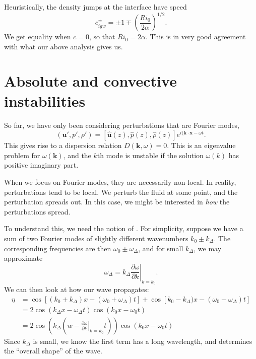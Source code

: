 \documentclass[a4paper]{article}
\begin{document}
Heuristically, the density jumps at the interface have speed
\[
  c_{igw}^{\pm} = \pm 1 \mp \left(\frac{Ri_0}{2\alpha}\right)^{1/2}.
\]
We get equality when $c = 0$, so that $Ri_0 = 2\alpha$. This is in very good agreement with what our above analysis gives us.



\section{Absolute and convective instabilities}

So far, we have only been considering perturbations that are Fourier modes,
\[
  (\mathbf{u}', p', \rho') = [\hat{\mathbf{u}}(z), \hat{p}(z), \hat{\rho}(z)]e^{i(\mathbf{k}\cdot \mathbf{x} - \omega t}.
\]
This gives rise to a dispersion relation $D(\mathbf{k}, \omega) = 0$. This is an eigenvalue problem for $\omega(\mathbf{k})$, and the $k$th mode is unstable if the solution $\omega(k)$ has positive imaginary part.

When we focus on Fourier modes, they are necessarily non-local. In reality, perturbations tend to be local. We perturb the fluid at some point, and the perturbation spreads out. In this case, we might be interested in \emph{how} the perturbations spread.

To understand this, we need the notion of . For simplicity, suppose we have a sum of two Fourier modes of slightly different wavenumbers $k_0 \pm k_\Delta$. The corresponding frequencies are then $\omega_0 \pm \omega_\Delta$, and for small $k_\Delta$, we may approximate
\[
  \omega_\Delta = k_\Delta \left.\frac{\partial \omega}{\partial k}\right|_{k = k_0}.
\]
We can then look at how our wave propagates:
\begin{align*}
  \eta &= \cos [(k_0 + k_\Delta)x - (\omega_0 + \omega_\Delta)t] + \cos [k_0 - k_\Delta)x - (\omega_0 - \omega_\Delta)t]\\
  &= 2 \cos (k_\Delta x - \omega_\Delta t) \cos (k_0 x - \omega_0 t)\\
  &= 2 \cos \left(k_\Delta \left(w - \left.\frac{\partial \omega}{\partial k}\right|_{k = k_0}t\right)\right) \cos (k_0 x - \omega_0 t)
\end{align*}
Since $k_\Delta$ is small, we know the first term has a long wavelength, and determines the ``overall shape'' of the wave.

\begin{center}
\end{center}
\end{document}
